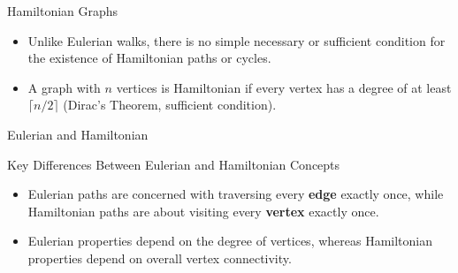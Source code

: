 \begin{properties}[]{Hamiltonian Graphs}
    \begin{itemize}
        \item Unlike Eulerian walks, there is no simple necessary or sufficient condition for the existence of Hamiltonian paths or cycles.
        \item A graph with $n$ vertices is Hamiltonian if every vertex has a degree of at least $\lceil n / 2 \rceil$ (Dirac's Theorem, sufficient condition).
    \end{itemize}
\end{properties}

\begin{example}[]{Eulerian and Hamiltonian}
    \begin{center}
    \end{center}
\end{example}

\begin{remarks}[]{Key Differences Between Eulerian and Hamiltonian Concepts}
    \begin{itemize}
        \item Eulerian paths are concerned with traversing every \textbf{edge} exactly once, while Hamiltonian paths are about visiting every \textbf{vertex} exactly once.
        \item Eulerian properties depend on the degree of vertices, whereas Hamiltonian properties depend on overall vertex connectivity.
    \end{itemize}
\end{remarks}

